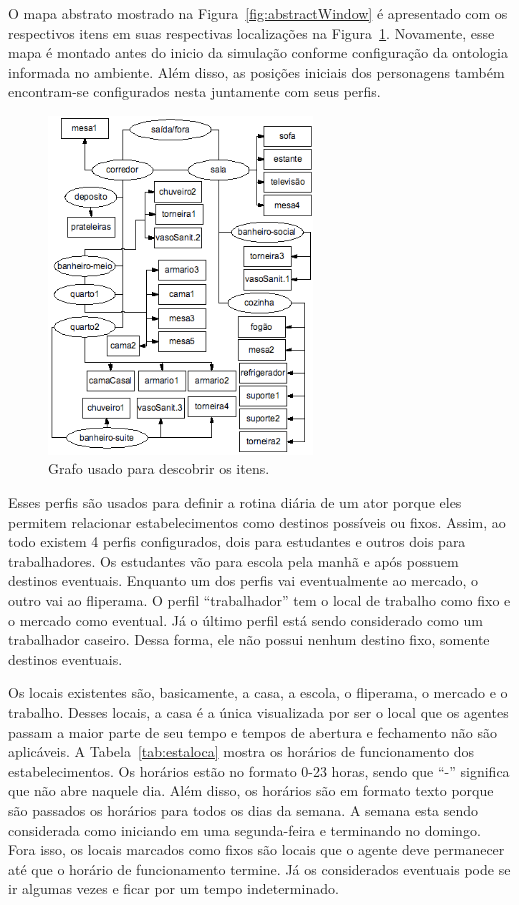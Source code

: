 O mapa abstrato mostrado na Figura~\ref{fig:abstractWindow} é apresentado
com os respectivos itens em suas respectivas localizações na
Figura~\ref{fig:abstractAnother}. Novamente, esse mapa é montado antes do
inicio da simulação conforme configuração da ontologia informada no
ambiente. Além disso, as posições iniciais dos personagens também encontram-se
configurados nesta juntamente com seus perfis.

\begin{figure}
	\begin{center}
		\includegraphics[width=7cm]{figuras/abstract-comitens.png}
	\end{center}
	\caption{Grafo usado para descobrir os itens.}
	\label{fig:abstractAnother}
\end{figure}

Esses perfis são usados para definir a rotina diária de um ator porque eles
permitem relacionar estabelecimentos como destinos possíveis ou fixos.
Assim, ao todo existem 4 perfis configurados, dois para estudantes e
outros dois para trabalhadores. Os estudantes vão para escola pela manhã e
após possuem destinos eventuais. Enquanto um dos perfis vai eventualmente ao
mercado, o outro vai ao fliperama. O perfil ``trabalhador'' tem o local de
trabalho como fixo e o mercado como eventual. Já o último perfil está sendo
considerado como um trabalhador caseiro. Dessa forma, ele não possui nenhum
destino fixo, somente destinos eventuais.

Os locais existentes são, basicamente, a casa, a escola, o fliperama, o
mercado e o trabalho. Desses locais, a casa é a única visualizada por ser o
local que os agentes passam a maior parte de seu tempo e tempos de abertura e
fechamento não são aplicáveis. A Tabela~\ref{tab:estaloca} mostra os horários
de funcionamento dos estabelecimentos. Os horários estão no formato 0-23
horas, sendo que ``-'' significa que não abre naquele dia. Além disso, os
horários são em formato texto porque são passados os horários para todos os
dias da semana. A semana esta sendo considerada como iniciando em uma
segunda-feira e terminando no domingo. Fora isso, os locais marcados como
fixos são locais que o agente deve permanecer até que o horário de
funcionamento termine. Já os considerados eventuais pode se ir algumas vezes
e ficar por um tempo indeterminado.

